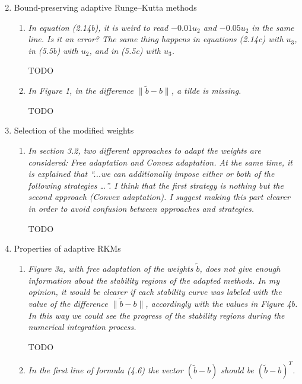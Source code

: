 \documentclass[11pt]{letter}
\newcommand{\revA}[1]{{\color{red}#1}}
\begin{document}
\begin{letter}{}
\begin{enumerate}[label=\arabic*.]
  \setcounter{enumi}{1}
  \item Bound-preserving adaptive Runge–Kutta methods
  \begin{enumerate}[label=\alph*)]
    \item \emph{%
    In equation (2.14b), it is weird to read $-0.01 u_2$ and $- 0.05 u_2$
    in the same line. Is it an error? The same thing happens in equations (2.14c)
    with $u_3$, in (5.5b) with $u_2$, and in (5.5c) with $u_3$.
    }

    \revA{TODO} %


    \item \emph{%
    In Figure 1, in the difference $\| \tilde b - b \|$, a tilde is missing.
    }

    \revA{TODO} %
  \end{enumerate}


  \item Selection of the modified weights
  \begin{enumerate}[label=\alph*)]
    \item \emph{%
    In section 3.2, two different approaches to adapt the weights are considered:
    Free adaptation and Convex adaptation. At the same time, it is explained that
    ``...we can additionally impose either or both of the following strategies \dots''.
    I think that the first strategy is nothing but the second approach (Convex
    adaptation). I suggest making this part clearer in order to avoid confusion
    between approaches and strategies.
    }

    \revA{TODO} %
  \end{enumerate}


  \item Properties of adaptive RKMs
  \begin{enumerate}[label=\alph*)]
    \item \emph{%
    Figure 3a, with free adaptation of the weights $\tilde b$, does not give enough
    information about the stability regions of the adapted methods. In my opinion,
    it would be clearer if each stability curve was labeled with the value of
    the difference $\| \tilde b - b \|$, accordingly with the values in Figure 4b.
    In this way we could see the progress of the stability regions during the
    numerical integration process.
    }

    \revA{TODO} %


    \item \emph{%
    In the first line of formula (4.6) the vector $(\tilde b - b)$ should be
     $(\tilde b - b)^T$.
    }


\end{enumerate}
\end{enumerate}
\end{letter}
\end{document}
